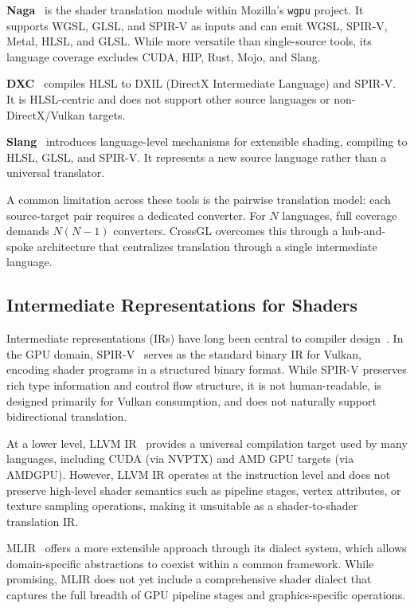 \documentclass{svproc}
\begin{document}
\textbf{Naga}~\cite{mozilla2023naga} is the shader translation module within Mozilla's \texttt{wgpu} project. It supports WGSL, GLSL, and SPIR-V as inputs and can emit WGSL, SPIR-V, Metal, HLSL, and GLSL. While more versatile than single-source tools, its language coverage excludes CUDA, HIP, Rust, Mojo, and Slang.

\textbf{DXC}~\cite{microsoft2023dxc} compiles HLSL to DXIL (DirectX Intermediate Language) and SPIR-V. It is HLSL-centric and does not support other source languages or non-DirectX/Vulkan targets.

\textbf{Slang}~\cite{he2018slang} introduces language-level mechanisms for extensible shading, compiling to HLSL, GLSL, and SPIR-V. It represents a new source language rather than a universal translator.

A common limitation across these tools is the pairwise translation model: each source-target pair requires a dedicated converter. For $N$ languages, full coverage demands $N(N-1)$ converters. CrossGL overcomes this through a hub-and-spoke architecture that centralizes translation through a single intermediate language.

\subsection{Intermediate Representations for Shaders}

Intermediate representations (IRs) have long been central to compiler design~\cite{aho2006compilers}. In the GPU domain, SPIR-V~\cite{khronos2022spirv} serves as the standard binary IR for Vulkan, encoding shader programs in a structured binary format. While SPIR-V preserves rich type information and control flow structure, it is not human-readable, is designed primarily for Vulkan consumption, and does not naturally support bidirectional translation.

At a lower level, LLVM IR~\cite{lattner2004llvm} provides a universal compilation target used by many languages, including CUDA (via NVPTX) and AMD GPU targets (via AMDGPU). However, LLVM IR operates at the instruction level and does not preserve high-level shader semantics such as pipeline stages, vertex attributes, or texture sampling operations, making it unsuitable as a shader-to-shader translation IR.

MLIR~\cite{lattner2021mlir} offers a more extensible approach through its dialect system, which allows domain-specific abstractions to coexist within a common framework. While promising, MLIR does not yet include a comprehensive shader dialect that captures the full breadth of GPU pipeline stages and graphics-specific operations.
\end{document}
